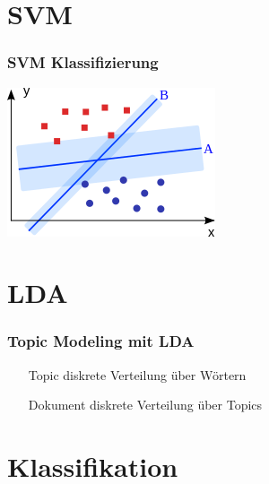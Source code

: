 \documentclass[12pt, xcolor=table]{beamer}
\begin{document}
\section{SVM} %
\label{sec:SVM}

\begin{frame}
    \frametitle{SVM Klassifizierung}
    \begin{center}
    \includegraphics[scale=0.75]{figures/Svm_intro.png}
    \end{center}
\end{frame}

\section{LDA} %
\label{sec:LDA}

\begin{frame}
    \frametitle{Topic Modeling mit LDA}
    \begin{itemize}
        \item[Topic] diskrete Verteilung über Wörtern
        \item[Dokument] diskrete Verteilung über Topics
    \end{itemize}
\end{frame}
\section{Klassifikation} %
\label{sec:Klassifikation}
\end{document}
